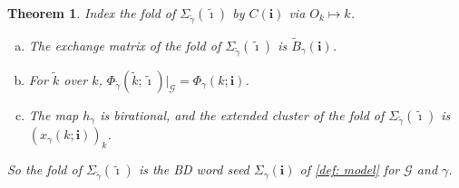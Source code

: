 \documentclass[a4paper]{amsart}
\numberwithin{equation}{section}
\newtheorem{theorem}{Theorem}[section]
\theoremstyle{definition}
\theoremstyle{remark}
\newcommand{\mcG}{\mathcal{G}}
\newcommand{\bfi}{\mathbf{i}}
\newcommand{\tbfi}{\widetilde{\boldsymbol{\imath}}}
\newcommand{\tB}{\widetilde{B}}
\newcommand{\tg}{\widetilde{\gamma}}
\begin{document}
\begin{theorem}
  \label{thm: fold model}
  Index the fold of $\Sigma_{\tg}(\tbfi)$ by $C(\bfi)$ via $O_k\mapsto k$.
  \begin{enumerate}[(a)]
    \item The exchange matrix of the fold of $\Sigma_{\tg}(\tbfi)$ is $\tB_\gamma(\bfi)$.
    \item For $\widetilde{k}$ over $k$, $\Phi_{\tg}(\widetilde{k};\tbfi)|_\mcG=\Phi_\gamma(k;\bfi)$.
    \item The map $h_\gamma$ is birational, and the extended cluster of the fold of $\Sigma_{\tg}(\tbfi)$ is $(x_\gamma(k;\bfi))_k$.
  \end{enumerate}
  So the fold of $\Sigma_{\tg}(\tbfi)$ is the BD word seed $\Sigma_\gamma(\bfi)$ of \cref{def: model} for $\mcG$ and $\gamma$.
\end{theorem}
\end{document}
